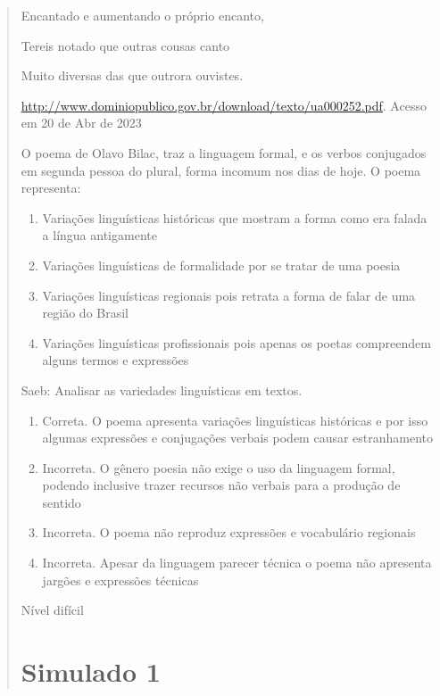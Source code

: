 {\begin{quote}
{\begin{itemize}
\begin{itemize}
Encantado e aumentando o próprio encanto,

Tereis notado que outras cousas canto

Muito diversas das que outrora ouvistes.

\href{http://www.dominiopublico.gov.br/download/texto/ua000252.pdf}{\uline{http://www.dominiopublico.gov.br/download/texto/ua000252.pdf}}.
Acesso em 20 de Abr de 2023

O poema de Olavo Bilac, traz a linguagem formal, e os verbos conjugados
em segunda pessoa do plural, forma incomum nos dias de hoje. O poema
representa:

\begin{enumerate}

\item
  Variações linguísticas históricas que mostram a forma como era falada
  a língua antigamente
\item
  Variações linguísticas de formalidade por se tratar de uma poesia
\item
  Variações linguísticas regionais pois retrata a forma de falar de uma
  região do Brasil
\item
  Variações linguísticas profissionais pois apenas os poetas compreendem
  alguns termos e expressões
\end{enumerate}

Saeb: Analisar as variedades linguísticas em textos.

\begin{enumerate}
\def\labelenumi{\arabic{enumi}.}
\item
  Correta. O poema apresenta variações linguísticas históricas e por
  isso algumas expressões e conjugações verbais podem causar
  estranhamento
\item
  Incorreta. O gênero poesia não exige o uso da linguagem formal,
  podendo inclusive trazer recursos não verbais para a produção de
  sentido
\item
  Incorreta. O poema não reproduz expressões e vocabulário regionais
\item
  Incorreta. Apesar da linguagem parecer técnica o poema não apresenta
  jargões e expressões técnicas
\end{enumerate}

Nível difícil

\chapter{Simulado 1}


\end{itemize}
\end{itemize}}
\end{quote}}
